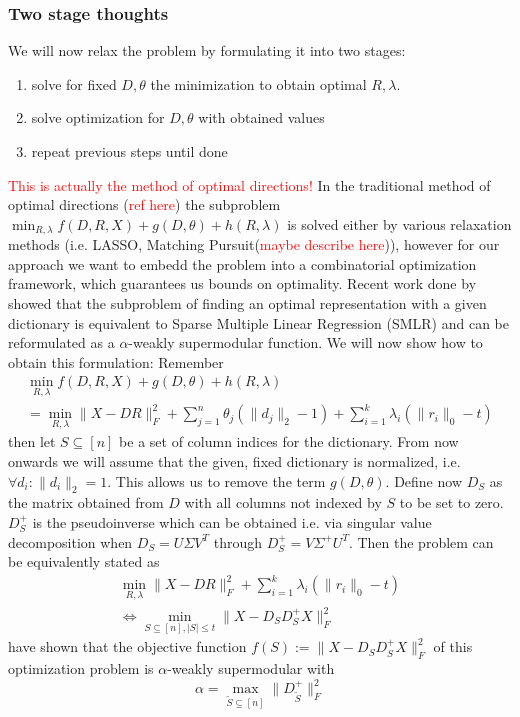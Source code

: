 \documentclass{article}
\begin{document}
\subsubsection{Two stage thoughts}
We will now relax the problem by formulating it into two stages:
\begin{enumerate}
\item solve for fixed $D, \theta$ the minimization to obtain optimal $R, \lambda$.
\item solve optimization for $D, \theta$ with obtained values
\item repeat previous steps until done
\end{enumerate}
\textcolor{red}{This is actually the method of optimal directions!}
In the traditional method of optimal directions (\textcolor{red}{ref here}) the subproblem $\min_{R, \lambda} f(D, R, X) + g(D, \theta) + h(R, \lambda)$ is solved either by various relaxation methods (i.e. LASSO, Matching Pursuit(\textcolor{red}{maybe describe here})), however for our approach we want to embedd the problem into a combinatorial optimization framework, which guarantees us bounds on optimality. Recent work done by \cite{weaklyalpha} showed that the subproblem of finding an optimal representation with a given dictionary is equivalent to Sparse Multiple Linear Regression (SMLR) and can be reformulated as a $\alpha$-weakly supermodular function. We will now show how to obtain this formulation:
Remember
\[
\begin{split}
\min_{R, \lambda} f(D, R, X) + g(D, \theta) + h(R, \lambda) \\
= \min_{R, \lambda} \|X -D R\|_F^2 + \sum_{j=1}^n \theta_j (\| d_j\|_2 - 1)+ \sum_{i=1}^k \lambda_i (\| r_i \|_0 - t)
\end{split}
\]
then let $S \subseteq [n]$ be a set of column indices for the dictionary. From now onwards we will assume that the given, fixed dictionary is normalized, i.e. $\forall d_i: \|d_i \|_2 = 1$. This allows us to remove the term $g(D, \theta)$. Define now $D_S$ as the matrix obtained from $D$ with all columns not indexed by $S$ to be set to zero. $D_S^+$ is the pseudoinverse which can be obtained i.e. via singular value decomposition when $D_S = U\Sigma V^T$ through $D_S^+ = V \Sigma^+ U^T$.
Then the problem can be equivalently stated as
\[
\begin{split}
 \min_{R, \lambda} \|X  -D R\|_F^2 + \sum_{i=1}^k \lambda_i (\| r_i \|_0 - t)\\
 \Longleftrightarrow 
  \min_{S \subseteq [n], |S| \leq t} \|X  -D_SD_S^+ X\|_F^2
 \end{split}
\]
\cite{weaklyalpha} have shown that the objective function $f(S) := \|X  -D_SD_S^+ X\|_F^2$ of this optimization problem is $\alpha$-weakly supermodular with 
\[ 
\alpha = \max_{\tilde{S} \subseteq [n]}\| D_{\tilde{S}}^+ \|_F^2
\]
\end{document}

